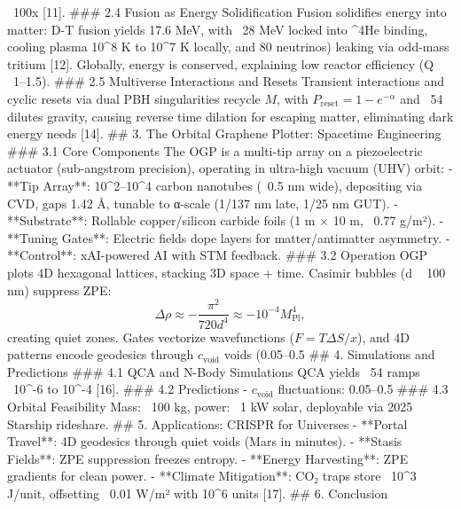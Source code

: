 ~100x [11]. 
### 2.4 Fusion as Energy Solidification 
Fusion solidifies energy into matter: D-T fusion yields 17.6 MeV, with ~28 MeV locked into ^4He 
binding, cooling plasma 10^8 K to 10^7 K locally, and 80%
neutrinos) leaking via odd-mass tritium [12]. Globally, energy is conserved, explaining low 
reactor efficiency (Q ~1–1.5). 
### 2.5 Multiverse Interactions and Resets 
Transient interactions and cyclic resets via dual PBH singularities recycle \( M \), with \( 
P_{\text{reset}} = 1 - e^{-\alpha} \) and ~54%
dilutes gravity, causing reverse time dilation for escaping matter, eliminating dark energy needs 
[14]. 
## 3. The Orbital Graphene Plotter: Spacetime Engineering 
### 3.1 Core Components 
The OGP is a multi-tip array on a piezoelectric actuator (sub-angstrom precision), operating in 
ultra-high vacuum (UHV) orbit: - **Tip Array**: 10^2–10^4 carbon nanotubes (~0.5 nm wide), depositing via CVD, gaps 1.42 Å, 
tunable to α-scale (1/137 nm late, 1/25 nm GUT). - **Substrate**: Rollable copper/silicon carbide foils (1 m × 10 m, ~0.77 g/m²). - **Tuning Gates**: Electric fields dope layers for matter/antimatter asymmetry. - **Control**: xAI-powered AI with STM feedback. 
### 3.2 Operation 
OGP plots 4D hexagonal lattices, stacking 3D space + time. Casimir bubbles (d ~ 100 nm) 
suppress ZPE: 
\[ \Delta \rho \approx - \frac{\pi^2}{720 d^4} \approx -10^{-4} M_{\text{Pl}}^4, \] 
creating quiet zones. Gates vectorize wavefunctions (\( F = T \Delta S / x \)), and 4D patterns 
encode geodesics through \( c_{\text{void}} \) voids (0.05–0.5%
## 4. Simulations and Predictions 
### 4.1 QCA and N-Body Simulations 
QCA yields ~54%
ramps ~10^{-6} to 10^{-4} [16]. 
### 4.2 Predictions - \( c_{\text{void}} \) fluctuations: 0.05–0.5%
### 4.3 Orbital Feasibility 
Mass: ~100 kg, power: ~1 kW solar, deployable via 2025 Starship rideshare. 
## 5. Applications: CRISPR for Universes - **Portal Travel**: 4D geodesics through quiet voids (Mars in minutes). - **Stasis Fields**: ZPE suppression freezes entropy. - **Energy Harvesting**: ZPE gradients for clean power. - **Climate Mitigation**: CO₂ traps store ~10^3 J/unit, offsetting ~0.01 W/m² with 10^6 units [17]. 
## 6. Conclusion 
